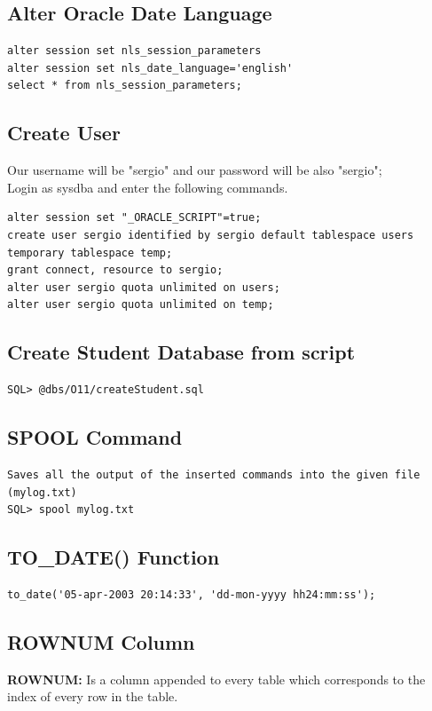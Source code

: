 \documentclass[twoside]{article}
\begin{document}
\subsection{Alter Oracle Date Language}
\begin{verbatim}
alter session set nls_session_parameters
alter session set nls_date_language='english'
select * from nls_session_parameters;
\end{verbatim}
\subsection{Create User}
Our username will be "sergio" and our password will be also "sergio"; \\
Login as sysdba and enter the following commands.
\begin{verbatim}
alter session set "_ORACLE_SCRIPT"=true;
create user sergio identified by sergio default tablespace users temporary tablespace temp;
grant connect, resource to sergio;
alter user sergio quota unlimited on users;
alter user sergio quota unlimited on temp;
\end{verbatim}
\subsection{Create Student Database from script}
\begin{verbatim}
SQL> @dbs/O11/createStudent.sql
\end{verbatim}
\subsection{SPOOL Command}
\begin{verbatim}
Saves all the output of the inserted commands into the given file (mylog.txt)
SQL> spool mylog.txt
\end{verbatim}
\subsection{TO\_DATE() Function}
\begin{verbatim}
to_date('05-apr-2003 20:14:33', 'dd-mon-yyyy hh24:mm:ss');
\end{verbatim}

\subsection{ROWNUM Column}
\textbf{ROWNUM: } Is a column appended to every table which corresponds to the index of every row in the table.
\end{document}
